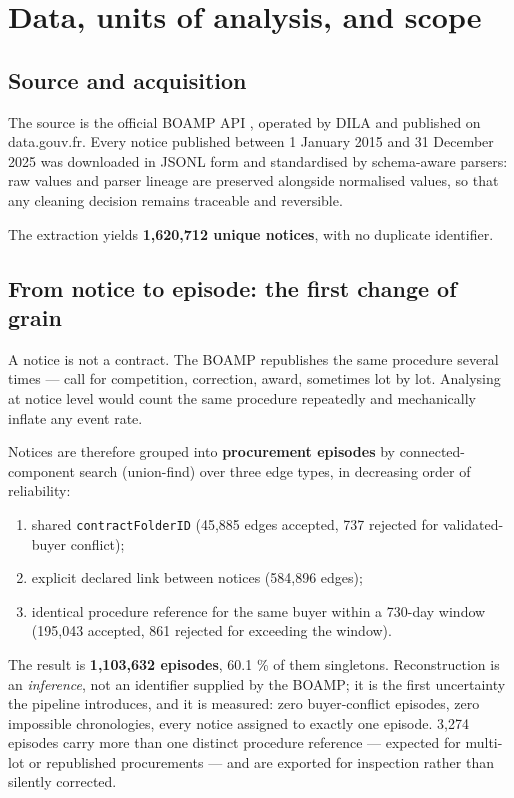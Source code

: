 \section{Data, units of analysis, and scope}

\subsection{Source and acquisition}

The source is the official BOAMP API \citep{boampapi}, operated by DILA and published on data.gouv.fr. Every notice published between 1 January 2015 and 31 December 2025 was downloaded in JSONL form and standardised by schema-aware parsers: raw values and parser lineage are preserved alongside normalised values, so that any cleaning decision remains traceable and reversible.

The extraction yields \textbf{1,620,712 unique notices}, with no duplicate identifier.

\subsection{From notice to episode: the first change of grain}

A notice is not a contract. The BOAMP republishes the same procedure several times --- call for competition, correction, award, sometimes lot by lot. Analysing at notice level would count the same procedure repeatedly and mechanically inflate any event rate.

Notices are therefore grouped into \textbf{procurement episodes} by connected-component search (union-find) over three edge types, in decreasing order of reliability:

\begin{enumerate}
\def\labelenumi{\arabic{enumi}.}
\tightlist
\item
  shared \texttt{contractFolderID} (45,885 edges accepted, 737 rejected for validated-buyer conflict);
\item
  explicit declared link between notices (584,896 edges);
\item
  identical procedure reference for the same buyer within a 730-day window (195,043 accepted, 861 rejected for exceeding the window).
\end{enumerate}

The result is \textbf{1,103,632 episodes}, 60.1 \% of them singletons. Reconstruction is an \emph{inference}, not an identifier supplied by the BOAMP; it is the first uncertainty the pipeline introduces, and it is measured: zero buyer-conflict episodes, zero impossible chronologies, every notice assigned to exactly one episode. 3,274 episodes carry more than one distinct procedure reference --- expected for multi-lot or republished procurements --- and are exported for inspection rather than silently corrected.

